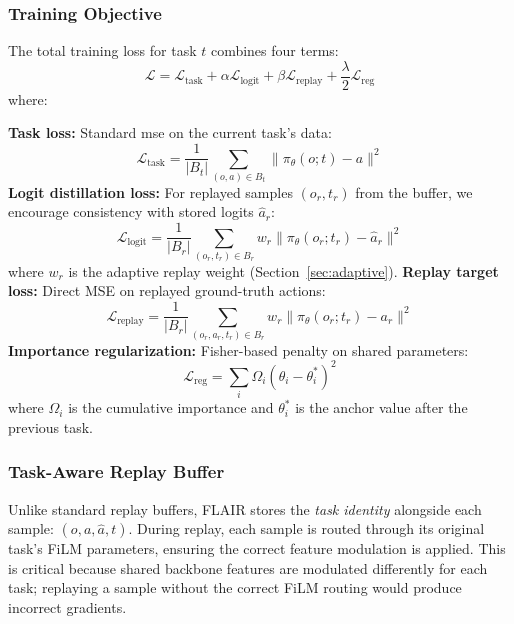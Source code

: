 \documentclass[3p,times,procedia]{elsarticle}
\begin{document}
\subsubsection{Training Objective}

The total training loss for task $t$ combines four terms:
\begin{equation}
    \mathcal{L} = \mathcal{L}_{\text{task}} + \alpha \mathcal{L}_{\text{logit}} + \beta \mathcal{L}_{\text{replay}} + \frac{\lambda}{2} \mathcal{L}_{\text{reg}}
    \label{eq:total_loss}
\end{equation}
where:

\textbf{Task loss:} Standard \ac{mse} on the current task's data:
\begin{equation}
    \mathcal{L}_{\text{task}} = \frac{1}{|B_t|}\sum_{(o,a) \in B_t} \|\pi_\theta(o; t) - a\|^2
\end{equation}
\textbf{Logit distillation loss:} For replayed samples $(o_r, t_r)$ from the buffer, we encourage consistency with stored logits $\hat{a}_r$:
\begin{equation}
    \mathcal{L}_{\text{logit}} = \frac{1}{|B_r|}\sum_{(o_r, t_r) \in B_r} w_r \|\pi_\theta(o_r; t_r) - \hat{a}_r\|^2
\end{equation}
where $w_r$ is the adaptive replay weight (Section~\ref{sec:adaptive}).
\textbf{Replay target loss:} Direct MSE on replayed ground-truth actions:
\begin{equation}
    \mathcal{L}_{\text{replay}} = \frac{1}{|B_r|}\sum_{(o_r, a_r, t_r) \in B_r} w_r \|\pi_\theta(o_r; t_r) - a_r\|^2
\end{equation}
\textbf{Importance regularization:} Fisher-based penalty on shared parameters:
\begin{equation}
    \mathcal{L}_{\text{reg}} = \sum_{i} \Omega_i (\theta_i - \theta_i^*)^2
    \label{eq:importance_reg}
\end{equation}
where $\Omega_i$ is the cumulative importance and $\theta_i^*$ is the anchor value after the previous task.

\subsubsection{Task-Aware Replay Buffer}

Unlike standard replay buffers, FLAIR stores the \emph{task identity} alongside each sample: $(o, a, \hat{a}, t)$. During replay, each sample is routed through its original task's FiLM parameters, ensuring the correct feature modulation is applied. This is critical because shared backbone features are modulated differently for each task; replaying a sample without the correct FiLM routing would produce incorrect gradients.
\end{document}
